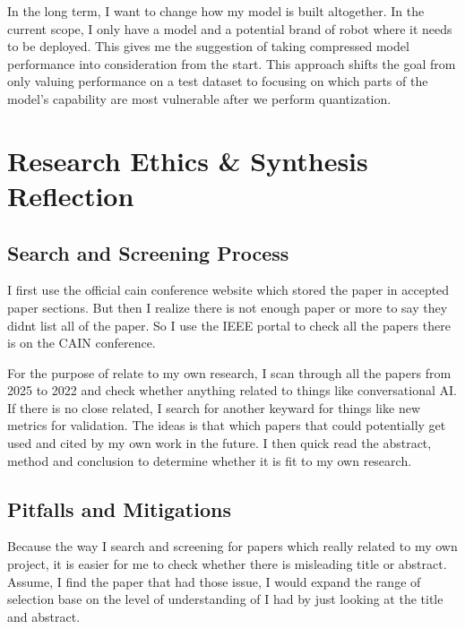 \documentclass[11pt]{article}
\begin{document}
In the long term, I want to change how my model is built altogether. In the current scope, I only have a model and a potential brand of robot where it needs to be deployed. This gives me the suggestion of taking compressed model performance into consideration from the start. This approach shifts the goal from only valuing performance on a test dataset to focusing on which parts of the model’s capability are most vulnerable after we perform quantization.

\section{Research Ethics \& Synthesis Reflection}
\subsection{Search and Screening Process}
I first use the official cain conference website which stored the paper in accepted paper sections. But then I realize there is not enough paper or more to say they didnt list all of the paper. So I use the IEEE portal to check all the papers there is on the CAIN conference. 

For the purpose of relate to my own research, I scan through all the papers from 2025 to 2022 and check whether anything related to things like conversational AI. If there is no close related, I search for another keyward for things like new metrics for validation. The ideas is that which papers that could potentially get used and cited by my own work in the future. I then quick read the abstract, method and conclusion to determine whether it is fit to my own research.

\subsection{Pitfalls and Mitigations}
Because the way I search and screening for papers which really related to my own project, it is easier for me to check whether there is misleading title or abstract. Assume, I find the paper that had those issue, I would expand the range of selection base on the level of understanding of I had by just looking at the title and abstract. 
\end{document}
